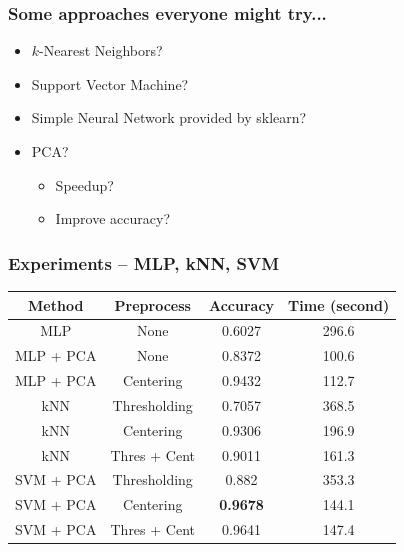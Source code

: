 \documentclass[11pt]{beamer} %
\begin{document}
\begin{frame}
\frametitle{Some approaches everyone might try...}
\begin{itemize}
    \item $k$-Nearest Neighbors?
    \item Support Vector Machine?
    \item Simple Neural Network provided by sklearn?
    \item PCA?
    \begin{itemize}
        \item Speedup?
        \item Improve accuracy?
    \end{itemize}
\end{itemize}
\end{frame}

\begin{frame}
\frametitle{Experiments -- MLP, kNN, SVM}
\begin{table}[htbp]
    \centering
    \begin{tabular}{cccc}
    \toprule
        Method & Preprocess & Accuracy & Time (second)  \\
    \midrule
        MLP & None & 0.6027 & 296.6  \\
        MLP + PCA & None & 0.8372 & 100.6  \\
        MLP + PCA & Centering & 0.9432 & 112.7  \\
    \midrule
        kNN & Thresholding & 0.7057 & 368.5  \\
        kNN & Centering & 0.9306 & 196.9  \\
        kNN & Thres + Cent & 0.9011 & 161.3 \\ 
    \midrule
        SVM + PCA & Thresholding & 0.882 & 353.3  \\
        SVM + PCA & Centering & \textbf{0.9678} & 144.1  \\
        SVM + PCA & Thres + Cent & 0.9641 & 147.4  \\
    \bottomrule
    \end{tabular}
\end{table}
\end{frame}
\end{document}
